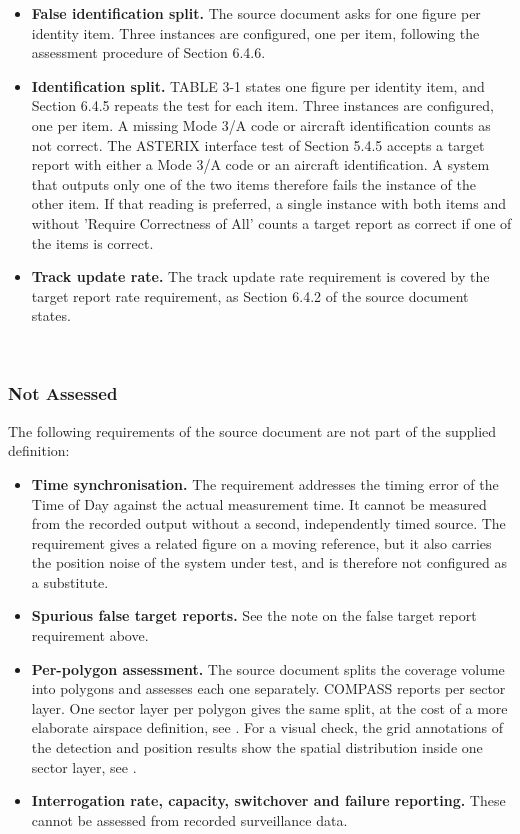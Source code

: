 \begin{itemize}
\item \textbf{False identification split.} The source document asks for one figure per identity item. Three instances are configured, one per item, following the assessment procedure of Section 6.4.6.
\item \textbf{Identification split.} TABLE 3-1 states one figure per identity item, and Section 6.4.5 repeats the test for each item. Three instances are configured, one per item. A missing Mode 3/A code or aircraft identification counts as not correct. The ASTERIX interface test of Section 5.4.5 accepts a target report with either a Mode 3/A code or an aircraft identification. A system that outputs only one of the two items therefore fails the instance of the other item. If that reading is preferred, a single instance with both items and without 'Require Correctness of All' counts a target report as correct if one of the items is correct.
\item \textbf{Track update rate.} The track update rate requirement is covered by the target report rate requirement, as Section 6.4.2 of the source document states.
\end{itemize}
\ \\

\subsubsection{Not Assessed}

The following requirements of the source document are not part of the supplied definition:
\begin{itemize}
\item \textbf{Time synchronisation.} The requirement addresses the timing error of the Time of Day against the actual measurement time. It cannot be measured from the recorded output without a second, independently timed source. The  requirement gives a related figure on a moving reference, but it also carries the position noise of the system under test, and is therefore not configured as a substitute.
\item \textbf{Spurious false target reports.} See the note on the false target report requirement above.
\item \textbf{Per-polygon assessment.} The source document splits the coverage volume into polygons and assesses each one separately. COMPASS reports per sector layer. One sector layer per polygon gives the same split, at the cost of a more elaborate airspace definition, see . For a visual check, the grid annotations of the detection and position results show the spatial distribution inside one sector layer, see .
\item \textbf{Interrogation rate, capacity, switchover and failure reporting.} These cannot be assessed from recorded surveillance data.
\end{itemize}
